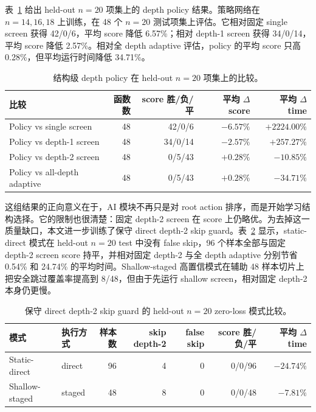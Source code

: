 \documentclass[UTF8,fontset=macnew,11pt]{ctexart}
\begin{document}
表~\ref{tab:policy} 给出 held-out $n=20$ 项集上的 depth policy 结果。策略网络在 $n=14,16,18$ 上训练，在 48 个 $n=20$ 测试项集上评估。它相对固定 single screen 获得 42/0/6，平均 score 降低 6.57\%；相对 depth-1 screen 获得 34/0/14，平均 score 降低 2.57\%。相对全 depth adaptive 评估，policy 的平均 score 只高 0.28\%，但平均运行时间降低 34.71\%。

\begin{table}[t]
\centering
\small
\caption{结构级 depth policy 在 held-out $n=20$ 项集上的比较。}
\label{tab:policy}
\begin{tabular}{lrrrr}
\toprule
比较 & 函数数 & score 胜/负/平 & 平均 $\Delta$ score & 平均 $\Delta$ time \\
\midrule
Policy vs single screen & 48 & 42/0/6 & $-6.57\%$ & $+2224.00\%$ \\
Policy vs depth-1 screen & 48 & 34/0/14 & $-2.57\%$ & $+257.27\%$ \\
Policy vs depth-2 screen & 48 & 0/5/43 & $+0.28\%$ & $-10.85\%$ \\
Policy vs all-depth adaptive & 48 & 0/5/43 & $+0.28\%$ & $-34.71\%$ \\
\bottomrule
\end{tabular}
\end{table}

这组结果的正向意义在于，AI 模块不再只是对 root action 排序，而是开始学习结构选择。它的限制也很清楚：固定 depth-2 screen 在 score 上仍略优。为去掉这一质量缺口，本文进一步训练了保守 direct depth-2 skip guard。表~\ref{tab:depth_guard} 显示，static-direct 模式在 held-out $n=20$ test 中没有 false skip，96 个样本全部与固定 depth-2 screen score 持平，并相对固定 depth-2 与全 depth adaptive 分别节省 0.54\% 和 24.74\% 的平均时间。Shallow-staged 高置信模式在辅助 48 样本切片上把安全跳过覆盖率提高到 8/48，但由于先运行 shallow screen，相对固定 depth-2 本身仍更慢。

\begin{table}[t]
\centering
\small
\caption{保守 direct depth-2 skip guard 的 held-out $n=20$ zero-loss 模式比较。}
\label{tab:depth_guard}
\begin{tabular}{llrrrrr}
\toprule
模式 & 执行方式 & 样本数 & skip depth-2 & false skip & score 胜/负/平 & 平均 $\Delta$ time \\
\midrule
Static-direct & direct & 96 & 4 & 0 & 0/0/96 & $-24.74\%$ \\
Shallow-staged & staged & 48 & 8 & 0 & 0/0/48 & $-7.81\%$ \\
\bottomrule
\end{tabular}
\end{table}
\end{document}
